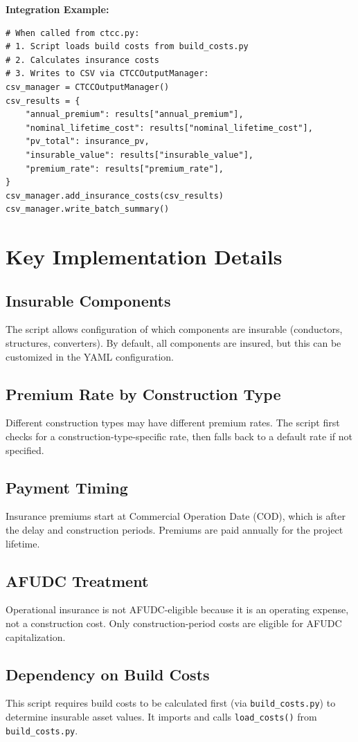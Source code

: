 \documentclass[12pt]{article}
\begin{document}
\textbf{Integration Example:}

\begin{lstlisting}
# When called from ctcc.py:
# 1. Script loads build costs from build_costs.py
# 2. Calculates insurance costs
# 3. Writes to CSV via CTCCOutputManager:
csv_manager = CTCCOutputManager()
csv_results = {
    "annual_premium": results["annual_premium"],
    "nominal_lifetime_cost": results["nominal_lifetime_cost"],
    "pv_total": insurance_pv,
    "insurable_value": results["insurable_value"],
    "premium_rate": results["premium_rate"],
}
csv_manager.add_insurance_costs(csv_results)
csv_manager.write_batch_summary()
\end{lstlisting}

\section{Key Implementation Details}

\subsection{Insurable Components}

The script allows configuration of which components are insurable (conductors, structures, converters). By default, all components are insured, but this can be customized in the YAML configuration.

\subsection{Premium Rate by Construction Type}

Different construction types may have different premium rates. The script first checks for a construction-type-specific rate, then falls back to a default rate if not specified.

\subsection{Payment Timing}

Insurance premiums start at Commercial Operation Date (COD), which is after the delay and construction periods. Premiums are paid annually for the project lifetime.

\subsection{AFUDC Treatment}

Operational insurance is not AFUDC-eligible because it is an operating expense, not a construction cost. Only construction-period costs are eligible for AFUDC capitalization.

\subsection{Dependency on Build Costs}

This script requires build costs to be calculated first (via \texttt{build\_costs.py}) to determine insurable asset values. It imports and calls \texttt{load\_costs()} from \texttt{build\_costs.py}.
\end{document}
